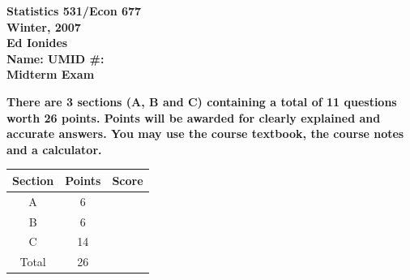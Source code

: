 \documentclass[12pt]{article}
\begin{document}
\begin{center}
{\bf Statistics 531/Econ 677\\

Winter, 2007\\

Ed Ionides\\
\vspace{7 mm}
Name: \hrulefill UMID \#: \hrulefill\\
\vspace{7 mm}
Midterm Exam}
\end{center}
{\bf There are 3 sections (A, B and C) containing a total of 11 questions worth
26 points. Points will be awarded for clearly explained and accurate answers. You may use the course textbook, the course notes and a calculator.}\\
\begin{center}
\renewcommand{\arraystretch}{2}
\begin{tabular}{||c|c|c||}
\hline
\hline
{Section} & {Points} & {Score}\\
\hline
\hline
A & 6 & \\
\hline
B & 6 & \\
\hline
C & 14 & \\
\hline
\hline
Total & 26 &  \\
\hline
\hline
\end{tabular}
\end{center}
\newpage
\end{document}
